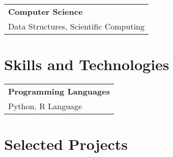 \documentclass[10pt]{article}
\newcommand{\tabularxwidth}{\textwidth}
\begin{document}
    
        \begin{tabularx}{\tabularxwidth}{X}
            \textbf{Computer Science} \\
            
    
            Data Structures, 
            Scientific Computing \\
        \end{tabularx}

        

    



    
        \section{Skills and Technologies}

    
        \begin{tabularx}{\tabularxwidth}{X}
            \textbf{Programming Languages} \\
            
    
            Python, 
            R Language \\
        \end{tabularx}

        

    



    
        \section{Selected Projects}

    
\end{document}
